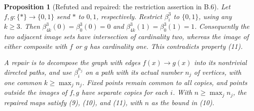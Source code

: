 \documentclass[11pt,a4paper]{article}
\newtheorem{proposition}[theorem]{Proposition}
\theoremstyle{definition}
\begin{document}
\begin{proposition}[Refuted and repaired: the restriction assertion in B.6]\label{C:source-defect}
Let $f,g:\{*\}\to\{0,1\}$ send $*$ to $0,1$, respectively.
Restrict $\beta_i^3$ to $\{0,1\}$, using any $k\geq3$.
Then $\beta_{4k}^3(0)=\beta_0^3(0)=0$ and
$\beta_{4k}^3(1)=\beta_0^3(1)=1$.
Consequently the two adjacent image sets have intersection of cardinality
two, whereas the image of either composite with $f$ or $g$ has
cardinality one.  This contradicts property (11).

A repair is to decompose the graph with edges $f(x)\to g(x)$ into its
nontrivial directed paths, and use $\beta_i^{n_j}$ on a path with its
actual number $n_j$ of vertices, with one common $k\geq\max_j n_j$.
Fixed points remain common to all copies, and points outside the images
of $f,g$ have separate copies for each $i$.  With
$n\geq\max_j n_j$, the repaired maps satisfy (9), (10), and (11), with
$n$ as the bound in (10).
\end{proposition}
\end{document}
